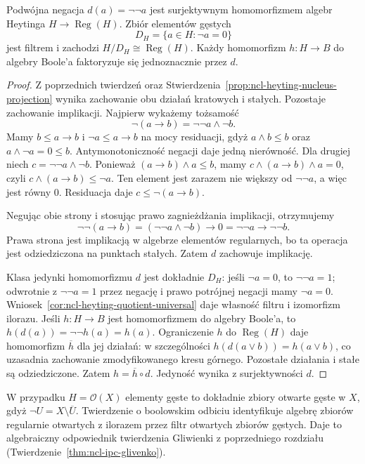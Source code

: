 \begin{twierdzenie}
\label{thm:ncl-heyting-boolean-reflection}
Podwójna negacja $d(a)=\neg\neg a$ jest
surjektywnym homomorfizmem algebr Heytinga
$H\to\operatorname{Reg}(H)$.
Zbiór elementów gęstych
\[
 D_H=\{a\in H:\neg a=0\}
\]
jest filtrem i zachodzi
$H/D_H\cong\operatorname{Reg}(H)$.
Każdy homomorfizm $h:H\to B$ do algebry Boole'a
faktoryzuje się jednoznacznie przez $d$.
\end{twierdzenie}
\begin{proof}
Z poprzednich twierdzeń oraz
Stwierdzenia~\ref{prop:ncl-heyting-nucleus-projection}
wynika zachowanie obu działań kratowych i stałych.
Pozostaje zachowanie implikacji.
Najpierw wykażemy tożsamość
\[
 \neg(a\to b)=\neg\neg a\wedge\neg b.
\]
Mamy $b\leq a\to b$ i $\neg a\leq a\to b$
na mocy residuacji, gdyż $a\wedge b\leq b$
oraz $a\wedge\neg a=0\leq b$.
Antymonotoniczność negacji daje jedną nierówność.
Dla drugiej niech $c=\neg\neg a\wedge\neg b$.
Ponieważ $(a\to b)\wedge a\leq b$,
mamy $c\wedge(a\to b)\wedge a=0$,
czyli $c\wedge(a\to b)\leq\neg a$.
Ten element jest zarazem nie większy od
$\neg\neg a$, a więc jest równy $0$.
Residuacja daje $c\leq\neg(a\to b)$.

Negując obie strony i stosując prawo
zagnieżdżania implikacji, otrzymujemy
\[
 \neg\neg(a\to b)
 =(\neg\neg a\wedge\neg b)\to0
 =\neg\neg a\to\neg\neg b.
\]
Prawa strona jest implikacją w algebrze
elementów regularnych, bo ta operacja jest
odziedziczona na punktach stałych.
Zatem $d$ zachowuje implikację.

Klasa jedynki homomorfizmu $d$ jest dokładnie
$D_H$: jeśli $\neg a=0$, to $\neg\neg a=1$;
odwrotnie z $\neg\neg a=1$ przez negację
i prawo potrójnej negacji mamy $\neg a=0$.
Wniosek~\ref{cor:ncl-heyting-quotient-universal}
daje własność filtru i izomorfizm ilorazu.
Jeśli $h:H\to B$ jest homomorfizmem do algebry
Boole'a, to $h(d(a))=\neg\neg h(a)=h(a)$.
Ograniczenie $h$ do $\operatorname{Reg}(H)$
daje homomorfizm $\overline h$ dla jej działań:
w szczególności
$h(d(a\vee b))=h(a\vee b)$, co uzasadnia
zachowanie zmodyfikowanego kresu górnego.
Pozostałe działania i stałe są odziedziczone.
Zatem $h=\overline h\circ d$.
Jedyność wynika z surjektywności $d$.
\end{proof}

W przypadku $H=\mathcal O(X)$ elementy gęste
to dokładnie zbiory otwarte gęste w $X$, gdyż
$\neg U=X\setminus\overline U$.
Twierdzenie o boolowskim odbiciu identyfikuje
algebrę zbiorów regularnie otwartych z ilorazem
przez filtr otwartych zbiorów gęstych.
Daje to algebraiczny odpowiednik twierdzenia
Gliwienki z poprzedniego rozdziału
(Twierdzenie~\ref{thm:ncl-ipc-glivenko}).

